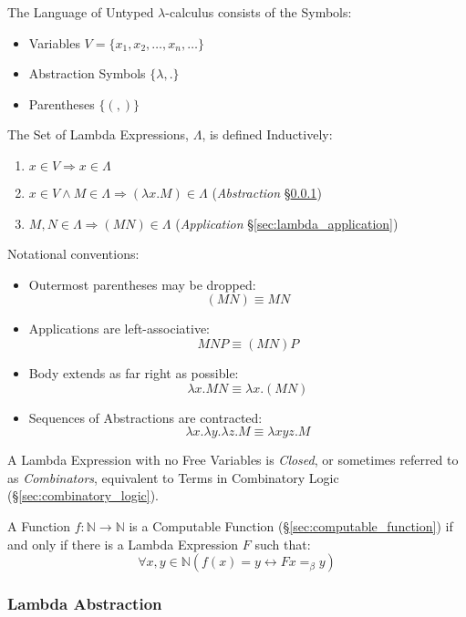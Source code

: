 The Language of Untyped $\lambda$-calculus consists of the Symbols:
\begin{itemize}
  \item Variables $V = \{ x_1, x_2, \ldots, x_n, \ldots \}$
  \item Abstraction Symbols $\{ \lambda, . \}$
  \item Parentheses $\{ (, ) \}$
\end{itemize}

The Set of Lambda Expressions, $\Lambda$, is defined Inductively:
\begin{enumerate}
  \item $x \in V \Rightarrow x \in \Lambda$
  \item $x \in V \wedge M \in \Lambda \Rightarrow (\lambda x.M) \in
    \Lambda$ (\emph{Abstraction} \S\ref{sec:lambda_abstraction})
  \item $M,N \in \Lambda \Rightarrow (M N) \in \Lambda$
    (\emph{Application} \S\ref{sec:lambda_application})
\end{enumerate}
Notational conventions:
\begin{itemize}
  \item Outermost parentheses may be dropped:
    \[
      (M N) \equiv M N
    \]
  \item Applications are left-associative:
    \[
      M N P \equiv (M N) P
    \]
  \item Body extends as far right as possible:
    \[
      \lambda x.M N \equiv \lambda x.(M N)
    \]
  \item Sequences of Abstractions are contracted:
    \[
      \lambda x.\lambda y.\lambda z.M \equiv
      \lambda xyz.M
    \]
\end{itemize}

A Lambda Expression with no Free Variables is \emph{Closed}, or
sometimes referred to as \emph{Combinators}, equivalent to Terms in
Combinatory Logic (\S\ref{sec:combinatory_logic}).

A Function $f : \mathbb{N} \rightarrow \mathbb{N}$ is a Computable
Function (\S\ref{sec:computable_function}) if and only if there is a
Lambda Expression $F$ such that:
\[
  \forall x,y \in \mathbb{N} (f(x)=y \leftrightarrow F x =_\beta y)
\]



\subsubsection{Lambda Abstraction}\label{sec:lambda_abstraction}


